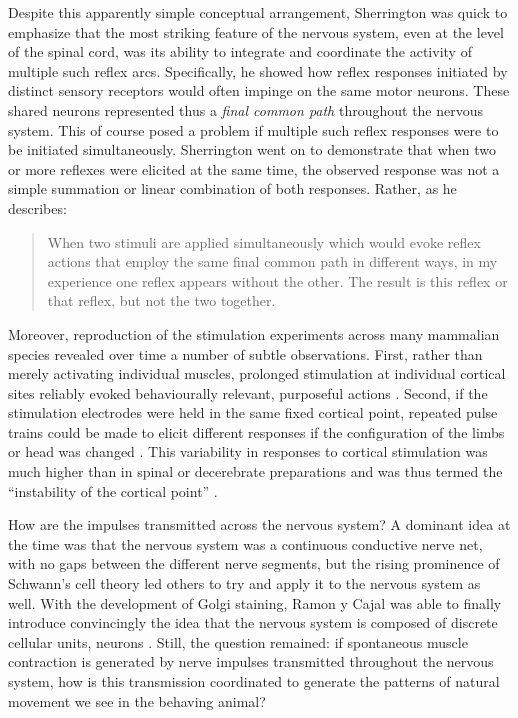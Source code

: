 Despite this apparently simple conceptual arrangement, Sherrington was quick to emphasize that the most striking feature of the nervous system, even at the level of the spinal cord, was its ability to integrate and coordinate the activity of multiple such reflex arcs. Specifically, he showed how reflex responses initiated by distinct sensory receptors would often impinge on the same motor neurons. These shared neurons represented thus a \emph{final common path} \cite{Sherrington1904} throughout the nervous system. This of course posed a problem if multiple such reflex responses were to be initiated simultaneously. Sherrington went on to demonstrate that when two or more reflexes were elicited at the same time, the observed response was not a simple summation or linear combination of both responses. Rather, as he describes:

\blockquote[{\protect\cite[p.461]{Sherrington1904}}]{When two stimuli are applied simultaneously which would evoke reflex actions that employ the same final common path in different ways, in my experience one reflex appears without the other. The result is this reflex or that reflex, but not the two together.}

Moreover, reproduction of the stimulation experiments across many mammalian species \cite{Ferrier1873,Clark1937} revealed over time a number of subtle observations. First, rather than merely activating individual muscles, prolonged stimulation at individual cortical sites reliably evoked behaviourally relevant, purposeful actions \cite{Ferrier1873,Clark1937}. Second, if the stimulation electrodes were held in the same fixed cortical point, repeated pulse trains could be made to elicit different responses if the configuration of the limbs or head was changed \cite{Ward1938}. This variability in responses to cortical stimulation was much higher than in spinal or decerebrate preparations and was thus termed the ``instability of the cortical point'' \cite{Brown1912,Leyton1917}.

How are the impulses transmitted across the nervous system? A dominant idea at the time was that the nervous system was a continuous conductive nerve net, with no gaps between the different nerve segments, but the rising prominence of Schwann's cell theory led others to try and apply it to the nervous system as well. With the development of Golgi staining, Ramon y Cajal was able to finally introduce convincingly the idea that the nervous system is composed of discrete cellular units, neurons \cite{RamonYCajal1894}. Still, the question remained: if spontaneous muscle contraction is generated by nerve impulses transmitted throughout the nervous system, how is this transmission coordinated to generate the patterns of natural movement we see in the behaving animal?

